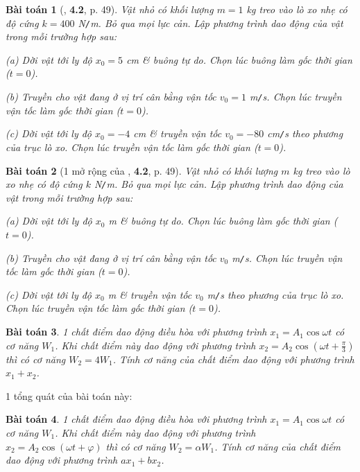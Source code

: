 \documentclass{article}
\numberwithin{equation}{section}
\newtheorem{baitoan}{Bài toán}[section]
\begin{document}
\begin{baitoan}[\cite{Giai_Toan_Trac_Nghiem_Vat_Ly_12_tap_1}, \textbf{4.2}, p. 49]
	Vật nhỏ có khối lượng $m = 1$ \emph{kg} treo vào lò xo nhẹ có độ cứng $k = 400$ \emph{N\texttt{/}m}. Bỏ qua mọi lực cản. Lập phương trình dao động của vật trong mỗi trường hợp sau:
	\begin{enumerate*}
		\item[(a)] Dời vật tới ly độ $x_0 = 5$ \emph{cm} \& buông tự do. Chọn lúc buông làm gốc thời gian ($t = 0$).
		\item[(b)] Truyền cho vật đang ở vị trí cân bằng vận tốc $v_0 = 1$ \emph{m\texttt{/}s}. Chọn lúc truyền vận tốc làm gốc thời gian ($t = 0$).
		\item[(c)] Dời vật tới ly độ $x_0 = -4$ \emph{cm} \& truyền vận tốc $v_0 = -80$ \emph{cm\texttt{/}s} theo phương của trục lò xo. Chọn lúc truyền vận tốc làm gốc thời gian ($t = 0$).
	\end{enumerate*}
\end{baitoan}

\begin{baitoan}[1 mở rộng của \cite{Giai_Toan_Trac_Nghiem_Vat_Ly_12_tap_1}, \textbf{4.2}, p. 49]
	Vật nhỏ có khối lượng $m$ \emph{kg} treo vào lò xo nhẹ có độ cứng $k$ \emph{N\texttt{/}m}. Bỏ qua mọi lực cản. Lập phương trình dao động của vật trong mỗi trường hợp sau:
	\begin{enumerate*}
		\item[(a)] Dời vật tới ly độ $x_0$ \emph{m} \& buông tự do. Chọn lúc buông làm gốc thời gian ($t = 0$).
		\item[(b)] Truyền cho vật đang ở vị trí cân bằng vận tốc $v_0$ \emph{m\texttt{/}s}. Chọn lúc truyền vận tốc làm gốc thời gian ($t = 0$).
		\item[(c)] Dời vật tới ly độ $x_0$ \emph{m} \& truyền vận tốc $v_0$ \emph{m\texttt{/}s} theo phương của trục lò xo. Chọn lúc truyền vận tốc làm gốc thời gian ($t = 0$).
	\end{enumerate*}
\end{baitoan}

\begin{baitoan}
	1 chất điểm dao động điều hòa với phương trình $x_1 = A_1\cos\omega t$ có cơ năng $W_1$. Khi chất điểm này dao động với phương trình $x_2 = A_2\cos\left(\omega t + \frac{\pi}{3}\right)$ thì có cơ năng $W_2 = 4W_1$. Tính cơ năng của chất điểm dao động với phương trình $x_1 + x_2$.
\end{baitoan}
1 tổng quát của bài toán này:

\begin{baitoan}
	1 chất điểm dao động điều hòa với phương trình $x_1 = A_1\cos\omega t$ có cơ năng $W_1$. Khi chất điểm này dao động với phương trình $x_2 = A_2\cos\left(\omega t + \varphi\right)$ thì có cơ năng $W_2 = \alpha W_1$. Tính cơ năng của chất điểm dao động với phương trình $ax_1 + bx_2$.
\end{baitoan}
\end{document}
